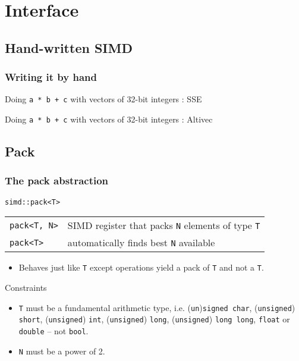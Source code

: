 
\section{Interface}
\subsection{Hand-written SIMD}
\begin{frame}[fragile]
	\frametitle{Writing it by hand}

	\begin{block}{Doing \texttt{a * b + c} with vectors of 32-bit integers : SSE}
	\lstsse
	\end{block}{}
	
	\begin{block}{Doing \texttt{a * b + c} with vectors of 32-bit integers : Altivec}
	\lstvmx
	\end{block}{}
\end{frame}

\subsection{Pack}
\frame
{
	\frametitle{The pack abstraction}
	\begin{block}{\texttt{simd::pack<T>}}
	\begin{tabular}{ll}
	\texttt{pack<T, N>} & SIMD register that packs \texttt{N} elements of type \texttt{T}\\
	\texttt{pack<T>} & automatically finds best \texttt{N} available
	\end{tabular}
	\begin{itemize}
\footnotesize
	\item Behaves just like \texttt{T} except operations yield a pack of \texttt{T} and not a \texttt{T}.
\end{itemize}
	\end{block}{}
	
	\begin{block}{Constraints}
         \begin{itemize}
\footnotesize
\item	\texttt{T} must be a fundamental arithmetic type, i.e. (\lstinline{un})\lstinline{signed char}, (\lstinline{unsigned}) \lstinline{short}, (\lstinline{unsigned}) \lstinline{int}, (\lstinline{unsigned}) \lstinline{long}, (\lstinline{unsigned}) \lstinline{long long}, \lstinline{float} or \lstinline{double} -- not \lstinline{bool}.
	
	\item \texttt{N} must be a power of 2.
	\end{itemize}
       \end{block}{}
}


